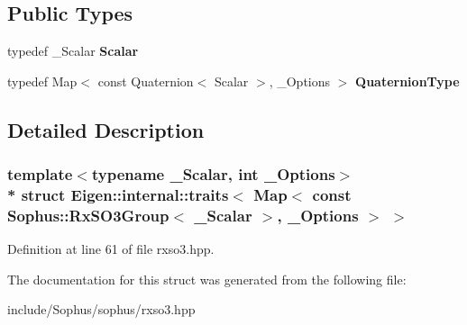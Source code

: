 \subsection*{Public Types}
\begin{DoxyCompactItemize}
\item 
typedef \+\_\+\+Scalar {\bfseries Scalar}\hypertarget{struct_eigen_1_1internal_1_1traits_3_01_map_3_01const_01_sophus_1_1_rx_s_o3_group_3_01___scalar_01_4_00_01___options_01_4_01_4_a7ec59c13ad809a7568e5bbdef4a8819e}{}\label{struct_eigen_1_1internal_1_1traits_3_01_map_3_01const_01_sophus_1_1_rx_s_o3_group_3_01___scalar_01_4_00_01___options_01_4_01_4_a7ec59c13ad809a7568e5bbdef4a8819e}

\item 
typedef Map$<$ const Quaternion$<$ Scalar $>$, \+\_\+\+Options $>$ {\bfseries Quaternion\+Type}\hypertarget{struct_eigen_1_1internal_1_1traits_3_01_map_3_01const_01_sophus_1_1_rx_s_o3_group_3_01___scalar_01_4_00_01___options_01_4_01_4_af549201042034e5b5a51e8cce11e3bf2}{}\label{struct_eigen_1_1internal_1_1traits_3_01_map_3_01const_01_sophus_1_1_rx_s_o3_group_3_01___scalar_01_4_00_01___options_01_4_01_4_af549201042034e5b5a51e8cce11e3bf2}

\end{DoxyCompactItemize}


\subsection{Detailed Description}
\subsubsection*{template$<$typename \+\_\+\+Scalar, int \+\_\+\+Options$>$\\*
struct Eigen\+::internal\+::traits$<$ Map$<$ const Sophus\+::\+Rx\+S\+O3\+Group$<$ \+\_\+\+Scalar $>$, \+\_\+\+Options $>$ $>$}



Definition at line 61 of file rxso3.\+hpp.



The documentation for this struct was generated from the following file\+:\begin{DoxyCompactItemize}
\item 
include/\+Sophus/sophus/rxso3.\+hpp\end{DoxyCompactItemize}
